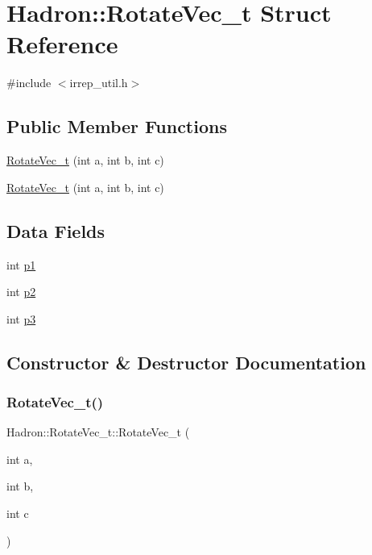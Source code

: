 \hypertarget{structHadron_1_1RotateVec__t}{}\section{Hadron\+:\+:Rotate\+Vec\+\_\+t Struct Reference}
\label{structHadron_1_1RotateVec__t}


{\ttfamily \#include $<$irrep\+\_\+util.\+h$>$}

\subsection*{Public Member Functions}
\begin{DoxyCompactItemize}
\item 
\mbox{\hyperlink{structHadron_1_1RotateVec__t_a137f265a3fb53776d2ee401044aab1fa}{Rotate\+Vec\+\_\+t}} (int a, int b, int c)
\item 
\mbox{\hyperlink{structHadron_1_1RotateVec__t_a137f265a3fb53776d2ee401044aab1fa}{Rotate\+Vec\+\_\+t}} (int a, int b, int c)
\end{DoxyCompactItemize}
\subsection*{Data Fields}
\begin{DoxyCompactItemize}
\item 
int \mbox{\hyperlink{structHadron_1_1RotateVec__t_aa01fc53854938079a4599536752b6121}{p1}}
\item 
int \mbox{\hyperlink{structHadron_1_1RotateVec__t_aaf71d154338bbf9c3775e8bce981febc}{p2}}
\item 
int \mbox{\hyperlink{structHadron_1_1RotateVec__t_aa3170eab6d36c15ae3f4e663e064a3e7}{p3}}
\end{DoxyCompactItemize}


\subsection{Constructor \& Destructor Documentation}
\mbox{\label{structHadron_1_1RotateVec__t_a137f265a3fb53776d2ee401044aab1fa}} 
\subsubsection{\texorpdfstring{RotateVec\_t()}{RotateVec\_t()}\hspace{0.1cm}{\footnotesize\ttfamily [1/2]}}
{\footnotesize\ttfamily Hadron\+::\+Rotate\+Vec\+\_\+t\+::\+Rotate\+Vec\+\_\+t (\begin{DoxyParamCaption}\item[{int}]{a,  }\item[{int}]{b,  }\item[{int}]{c }\end{DoxyParamCaption})\hspace{0.3cm}{\ttfamily [inline]}}


